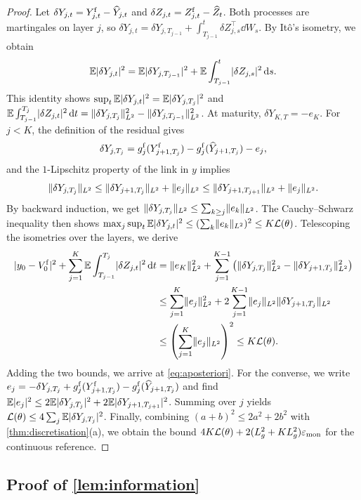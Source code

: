 \begin{proof}

Let $\delta Y_{j,t}=Y^{\mathrm f}_{j,t}-\widehat Y_{j,t}$ and $\delta Z_{j,t}=Z^{\mathrm f}_{j,t}-\widehat Z_t$. Both processes are martingales on layer $j$, so $\delta Y_{j,t}=\delta Y_{j,T_{j-1}}+\int_{T_{j-1}}^t\delta Z_{j,s}^\top\dd W_s$. By It\^o's isometry, we obtain
\[
\mathbb{E}\lvert \delta Y_{j,t}\rvert^2=\mathbb{E}\lvert \delta Y_{j,T_{j-1}}\rvert^2+\mathbb{E}\int_{T_{j-1}}^t\lvert \delta Z_{j,s}\rvert^2\,\mathrm{d} s .
\]
This identity shows $\sup_t\mathbb{E}\lvert \delta Y_{j,t}\rvert^2=\mathbb{E}\lvert \delta Y_{j,T_j}\rvert^2$ and $\mathbb{E}\int_{T_{j-1}}^{T_j}\lvert \delta Z_{j,t}\rvert^2\,\mathrm{d} t=\lVert \delta Y_{j,T_j}\rVert_{L^2}^2-\lVert \delta Y_{j,T_{j-1}}\rVert_{L^2}^2$. At maturity, $\delta Y_{K,T}=-e_K$. For $j<K$, the definition of the residual gives
\[
\delta Y_{j,T_j}=g^{\mathrm f}_j(Y^{\mathrm f}_{j+1,T_j})-g^{\mathrm f}_j(\widehat Y_{j+1,T_j})-e_j,
\]
and the $1$-Lipschitz property of the link in $y$ implies
\[
\lVert \delta Y_{j,T_j}\rVert_{L^2}\le\lVert \delta Y_{j+1,T_j}\rVert_{L^2}+\lVert e_j\rVert_{L^2}\le\lVert \delta Y_{j+1,T_{j+1}}\rVert_{L^2}+\lVert e_j\rVert_{L^2}.
\]
By backward induction, we get $\lVert \delta Y_{j,T_j}\rVert_{L^2}\le\sum_{k\ge j}\lVert e_k\rVert_{L^2}$. The Cauchy--Schwarz inequality then shows $\max_j\sup_t\mathbb{E}\lvert \delta Y_{j,t}\rvert^2\le(\sum_k\lVert e_k\rVert_{L^2})^2\le K\mathcal{L}(\theta)$. Telescoping the isometries over the layers, we derive
\begin{align*}
\lvert y_0-V^{\mathrm f}_0\rvert^2+\sum_{j=1}^K\mathbb{E}\int_{T_{j-1}}^{T_j}\lvert \delta Z_{j,t}\rvert^2\,\mathrm{d} t
&=\lVert e_K\rVert_{L^2}^2+\sum_{j=1}^{K-1}\left(\lVert \delta Y_{j,T_j}\rVert_{L^2}^2-\lVert \delta Y_{j+1,T_j}\rVert_{L^2}^2\right)\\
&\le\sum_{j=1}^K\lVert e_j\rVert_{L^2}^2+2\sum_{j=1}^{K-1}\lVert e_j\rVert_{L^2}\lVert \delta Y_{j+1,T_j}\rVert_{L^2}\\
&\le\left(\sum_{j=1}^K\lVert e_j\rVert_{L^2}\right)^2\le K\mathcal{L}(\theta).
\end{align*}
Adding the two bounds, we arrive at \eqref{eq:aposteriori}. For the converse, we write $e_j=-\delta Y_{j,T_j}+g^{\mathrm f}_j(Y^{\mathrm f}_{j+1,T_j})-g^{\mathrm f}_j(\widehat Y_{j+1,T_j})$ and find $\mathbb{E}\lvert e_j\rvert^2\le2\mathbb{E}\lvert \delta Y_{j,T_j}\rvert^2+2\mathbb{E}\lvert \delta Y_{j+1,T_{j+1}}\rvert^2$. Summing over $j$ yields $\mathcal{L}(\theta)\le4\sum_j\mathbb{E}\lvert \delta Y_{j,T_j}\rvert^2$. Finally, combining $(a+b)^2\le2a^2+2b^2$ with \cref{thm:discretisation}(a), we obtain the bound $4K\mathcal{L}(\theta)+2(L_g^2+KL_g^2)\varepsilon_{\mathrm{mon}}$ for the continuous reference.
\end{proof}

\subsection{Proof of \texorpdfstring{\cref{lem:information}}{Lemma 6}}\label{app:information}

